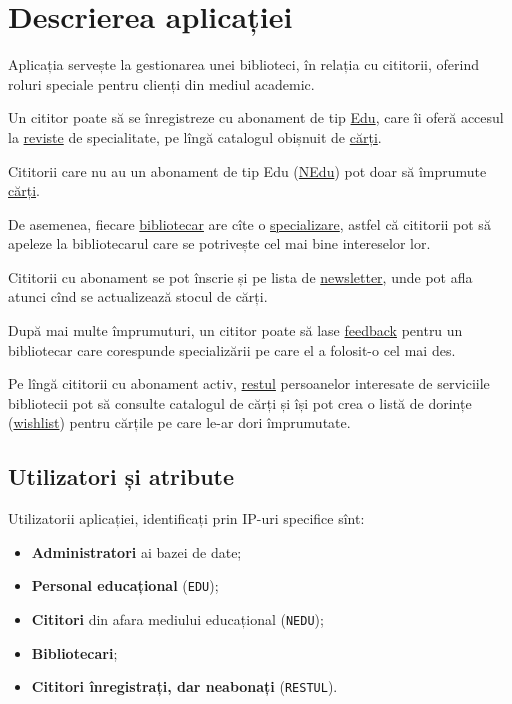 
\chapter{Descrierea aplicației}

\indent\indent Aplicația servește la gestionarea unei biblioteci, în relația cu cititorii,
oferind roluri speciale pentru clienți din mediul academic.

Un cititor poate să se înregistreze cu abonament de tip \underline{Edu},
care îi oferă accesul la \underline{reviste} de specialitate, pe lîngă
catalogul obișnuit de \underline{cărți}.

Cititorii care nu au un abonament de tip Edu (\underline{NEdu}) pot doar
să împrumute \underline{cărți}.

De asemenea, fiecare \underline{bibliotecar} are cîte o \underline{specializare},
astfel că cititorii pot să apeleze la bibliotecarul care se potrivește cel
mai bine intereselor lor.

Cititorii cu abonament se pot înscrie și pe lista de \underline{newsletter},
unde pot afla atunci cînd se actualizează stocul de cărți.

După mai multe împrumuturi, un cititor poate să lase \underline{feedback}
pentru un bibliotecar care corespunde specializării pe care el a folosit-o
cel mai des.

Pe lîngă cititorii cu abonament activ, \underline{restul} persoanelor
interesate de serviciile bibliotecii pot să consulte catalogul de cărți
și își pot crea o listă de dorințe (\underline{wishlist}) pentru cărțile
pe care le-ar dori împrumutate.

\section{Utilizatori și atribute}
\label{sec:util-atr}

Utilizatorii aplicației, identificați prin IP-uri specifice sînt:
\begin{itemize}
\item \textbf{Administratori} ai bazei de date;
\item \textbf{Personal educațional} (\texttt{EDU});
\item \textbf{Cititori} din afara mediului educațional (\texttt{NEDU});
\item \textbf{Bibliotecari};
\item \textbf{Cititori înregistrați, dar neabonați} (\texttt{RESTUL}).
\end{itemize}

